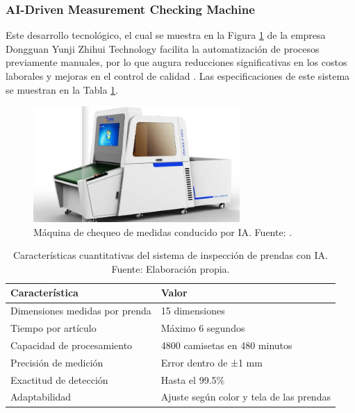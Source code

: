 \subsubsection{AI-Driven Measurement Checking Machine}

Este desarrollo tecnológico, el cual se muestra en la Figura \ref{fig:inspection_machine} de la empresa Dongguan Yunji Zhihui Technology facilita la automatización de procesos previamente manuales, por lo que augura reducciones significativas en los costos laborales y mejoras en el control de calidad \cite{RMG2021AIGarment}. Las especificaciones de este sistema se muestran en la Tabla \ref{tab:spec_inspection_machine}.

\begin{figure}[H]
	\centering
	\includegraphics[width=0.7\textwidth]{img/inspection_machine.png}
	\caption[Máquina de chequeo de medidas conducido por IA.]{Máquina de chequeo de medidas conducido por IA. Fuente: \cite{RMG2021AIGarment}.}
	\label{fig:inspection_machine}
\end{figure}

\begin{table}[h!]
	\centering
	\caption[Características cuantitativas del sistema de inspección de prendas con IA.]{Características cuantitativas del sistema de inspección de prendas con IA. Fuente: Elaboración propia.}
	\begin{tabular}{|l|l|}
		\hline
		\textbf{Característica} & \textbf{Valor} \\ \hline
		Dimensiones medidas por prenda & 15 dimensiones \\ \hline
		Tiempo por artículo & Máximo 6 segundos \\ \hline
		Capacidad de procesamiento & 4800 camisetas en 480 minutos \\ \hline
		Precisión de medición & Error dentro de ±1 mm \\ \hline
		Exactitud de detección & Hasta el 99.5\% \\ \hline
		Adaptabilidad & Ajuste según color y tela de las prendas \\ \hline
	\end{tabular}
	\label{tab:spec_inspection_machine}
\end{table}

